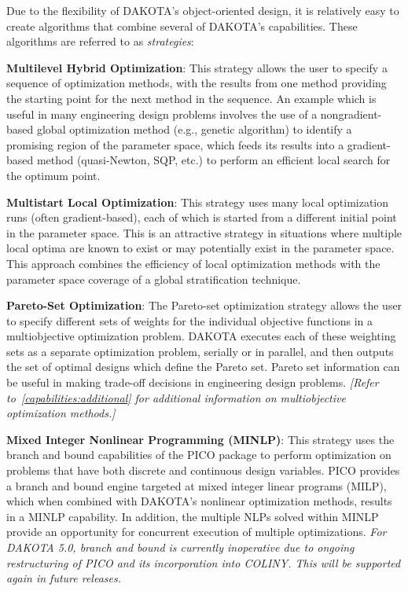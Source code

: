 Due to the flexibility of DAKOTA's object-oriented design, it is
relatively easy to create algorithms that combine several of DAKOTA's
capabilities. These algorithms are referred to as \emph{strategies}:

\textbf{Multilevel Hybrid Optimization}: This strategy allows the user to
specify a sequence of optimization methods, with the results from one
method providing the starting point for the next method in the
sequence. An example which is useful in many engineering design
problems involves the use of a nongradient-based global optimization
method (e.g., genetic algorithm) to identify a promising region of the
parameter space, which feeds its results into a gradient-based method
(quasi-Newton, SQP, etc.) to perform an efficient local search for the
optimum point.

\textbf{Multistart Local Optimization}: This strategy uses many local
optimization runs (often gradient-based), each of which is started
from a different initial point in the parameter space. This is an
attractive strategy in situations where multiple local optima are
known to exist or may potentially exist in the parameter space. This
approach combines the efficiency of local optimization methods with
the parameter space coverage of a global stratification technique.

\textbf{Pareto-Set Optimization}: The Pareto-set optimization strategy
allows the user to specify different sets of weights for the
individual objective functions in a multiobjective optimization
problem. DAKOTA executes each of these weighting sets as a separate
optimization problem, serially or in parallel, and then outputs the
set of optimal designs which define the Pareto set. Pareto set
information can be useful in making trade-off decisions in engineering
design problems.  \emph{[Refer to~\ref{capabilities:additional} for
additional information on multiobjective optimization methods.]}

\textbf{Mixed Integer Nonlinear Programming (MINLP)}: This strategy uses
the branch and bound capabilities of the PICO package to perform
optimization on problems that have both discrete and continuous design
variables. PICO provides a branch and bound engine targeted at mixed
integer linear programs (MILP), which when combined with DAKOTA's
nonlinear optimization methods, results in a MINLP capability. In
addition, the multiple NLPs solved within MINLP provide an opportunity
for concurrent execution of multiple optimizations.
\emph{For DAKOTA 5.0, branch and bound is currently inoperative due to 
ongoing restructuring of PICO and its incorporation into COLINY.
This will be supported again in future releases.}

